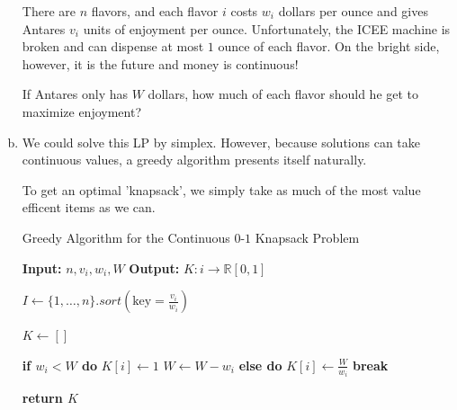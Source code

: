\documentclass[10pt]{article}
\begin{document}
\begin{solution}
\begin{enumerate}[(a)]
{        There are $n$ flavors, and each flavor $i$ costs $w_i$ dollars per ounce 
        and gives Antares $v_i$ units of enjoyment per ounce. 
        Unfortunately, the ICEE machine is broken and can dispense at most $1$ 
        ounce of each flavor. 
        On the bright side, however, it is the future and money is continuous! 

        If Antares only has $W$ dollars, how much of each flavor should he get 
        to maximize enjoyment?
    }
    \item {
    
        We could solve this LP by simplex. 
        However, because solutions can take continuous values, a greedy 
        algorithm presents itself naturally. 

        To get an optimal 'knapsack', we simply take as much of the most value 
        efficent items as we can. 

        \begin{algorithm}[H]
            \caption{Greedy Algorithm for the Continuous $0$-$1$ Knapsack Problem}
            \begin{algorithmic}[1]

                \Statex \textbf{Input: } $n, v_i, w_i, W$
                \Statex \textbf{Output: } $K : i \rightarrow \mathbb{R}[0, 1]$

                \State $I \gets \{1, \dots, n\}.sort(\text{key}=\frac{v_i}{w_i})$

                \State $K \gets []$

                    \State \textbf{if $w_i < W$ do} 
                    \State \qquad $K[i] \gets 1$
                    \State \qquad $W \gets W - w_i$
                    \State \textbf{else do}
                    \State \qquad $K[i] \gets \frac{W}{w_i}$
                    \State \qquad \textbf{break}
                \EndFor

                \State \textbf{return $K$}


\end{algorithmic}
\end{algorithm}}
\end{enumerate}
\end{solution}
\end{document}
